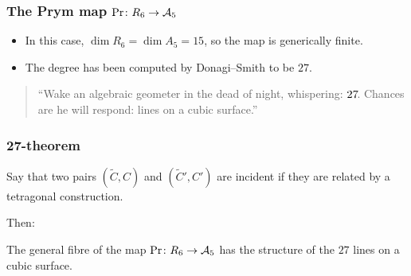 \begin{frame}
\frametitle{The Prym map $\Pr \colon R_6 \to \mathcal{A}_5$}

\begin{itemize}
	\item In this case, $\dim R_6 = \dim A_5 = 15$, so the map is generically finite.
	\pause
	\item The degree has been computed by Donagi--Smith to be $27$.
\end{itemize}

\pause

\vfill
\begin{quote}
    \large
    ``Wake an algebraic geometer in the dead of night, \phantom{``}whispering: $27\mkern-3mu$. Chances are he will respond: lines on a \phantom{``}cubic surface.''
\end{quote}
\vfill 

\end{frame}

\begin{frame}
\frametitle{27-theorem}

\begin{definition}
Say that two pairs $(\widetilde C, C)$ and $(\widetilde C', C')$ are \alert{incident} if they are related by a tetragonal construction.
\end{definition}

Then:

\pause
\hfill

\begin{theorem}
The general fibre of the map $\Pr \colon R_6 \to \mathcal{A}_5$ has the structure of the $27$ lines on a cubic surface.
\end{theorem}

\end{frame}